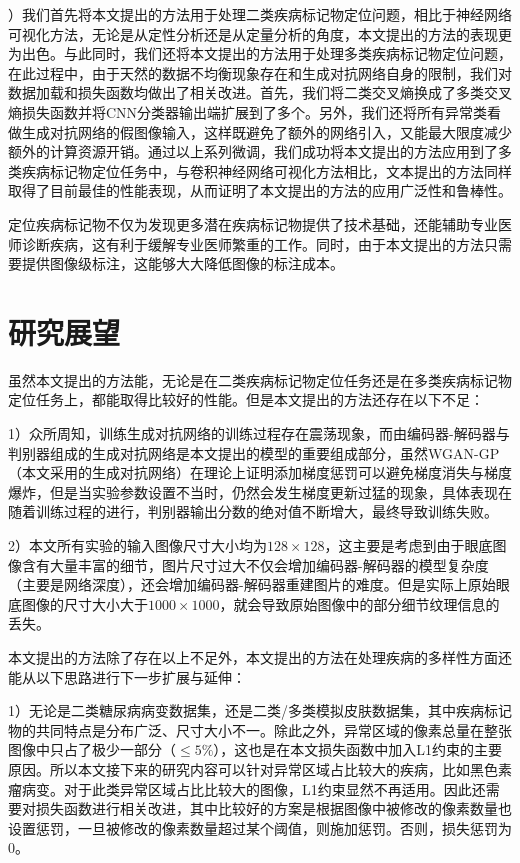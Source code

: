 ）我们首先将本文提出的方法用于处理二类疾病标记物定位问题，相比于神经网络可视化方法，无论是从定性分析还是从定量分析的角度，本文提出的方法的表现更为出色。与此同时，我们还将本文提出的方法用于处理多类疾病标记物定位问题，在此过程中，由于天然的数据不均衡现象存在和生成对抗网络自身的限制，我们对数据加载和损失函数均做出了相关改进。首先，我们将二类交叉熵换成了多类交叉熵损失函数并将CNN分类器输出端扩展到了多个。另外，我们还将所有异常类看做生成对抗网络的假图像输入，这样既避免了额外的网络引入，又能最大限度减少额外的计算资源开销。通过以上系列微调，我们成功将本文提出的方法应用到了多类疾病标记物定位任务中，与卷积神经网络可视化方法相比，文本提出的方法同样取得了目前最佳的性能表现，从而证明了本文提出的方法的应用广泛性和鲁棒性。

定位疾病标记物不仅为发现更多潜在疾病标记物提供了技术基础，还能辅助专业医师诊断疾病，这有利于缓解专业医师繁重的工作。同时，由于本文提出的方法只需要提供图像级标注，这能够大大降低图像的标注成本。

\section{研究展望}

虽然本文提出的方法能，无论是在二类疾病标记物定位任务还是在多类疾病标记物定位任务上，都能取得比较好的性能。但是本文提出的方法还存在以下不足：

1）众所周知，训练生成对抗网络的训练过程存在震荡现象，而由编码器-解码器与判别器组成的生成对抗网络是本文提出的模型的重要组成部分，虽然WGAN-GP（本文采用的生成对抗网络）在理论上证明添加梯度惩罚可以避免梯度消失与梯度爆炸，但是当实验参数设置不当时，仍然会发生梯度更新过猛的现象，具体表现在随着训练过程的进行，判别器输出分数的绝对值不断增大，最终导致训练失败。

2）本文所有实验的输入图像尺寸大小均为$128\times 128$，这主要是考虑到由于眼底图像含有大量丰富的细节，图片尺寸过大不仅会增加编码器-解码器的模型复杂度（主要是网络深度），还会增加编码器-解码器重建图片的难度。但是实际上原始眼底图像的尺寸大小大于$1000\times 1000$，就会导致原始图像中的部分细节纹理信息的丢失。

本文提出的方法除了存在以上不足外，本文提出的方法在处理疾病的多样性方面还能从以下思路进行下一步扩展与延伸：

1）无论是二类糖尿病病变数据集，还是二类/多类模拟皮肤数据集，其中疾病标记物的共同特点是分布广泛、尺寸大小不一。除此之外，异常区域的像素总量在整张图像中只占了极少一部分（$\le 5\%$），这也是在本文损失函数中加入L1约束的主要原因。所以本文接下来的研究内容可以针对异常区域占比较大的疾病，比如黑色素瘤病变。对于此类异常区域占比比较大的图像，L1约束显然不再适用。因此还需要对损失函数进行相关改进，其中比较好的方案是根据图像中被修改的像素数量也设置惩罚，一旦被修改的像素数量超过某个阈值，则施加惩罚。否则，损失惩罚为$0$。

